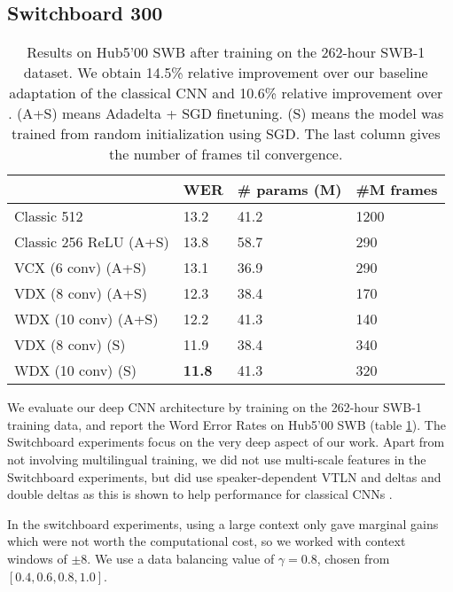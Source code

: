\documentclass{article}
\begin{document}
\subsection{Switchboard 300}
\label{ssec:swb}
\begin{table}[ht]
\centering
\begin{tabular}{| l | l | l | l |}
    \hline
    & WER &  \# params (M) & \#M frames\\ \hline
    Classic 512 \cite{soltau2014joint}      & 13.2  & 41.2 & 1200 \\
\hline
    Classic 256 ReLU (A+S)                        & 13.8  & 58.7 & 290 \\
    VCX (6 conv) (A+S)                            & 13.1  & 36.9 & 290 \\
    VDX (8 conv) (A+S)                            & 12.3  & 38.4 & 170 \\ WDX (10 conv) (A+S)                           & 12.2  & 41.3 & 140 \\ \hline
    VDX (8 conv) (S)                        & 11.9  & 38.4 & 340 \\  WDX (10 conv) (S)                       & \bf{11.8}  & 41.3 & 320 \\  \hline
\end{tabular}
\caption{\label{tab:hub5}Results on Hub5'00 SWB after training on the 262-hour SWB-1 dataset.
    We obtain 14.5\% relative improvement
    over our baseline adaptation of the classical CNN
    and 10.6\% relative improvement over \cite{soltau2014joint}.
    (A+S) means Adadelta + SGD finetuning. 
    (S) means the model was trained from random initialization using SGD.
    The last column gives the number of frames til convergence.
}
\end{table}

We evaluate our deep CNN architecture by training on the 262-hour SWB-1 training data,
and report the Word Error Rates on Hub5'00 SWB (table \ref{tab:hub5}).
The Switchboard experiments focus on the very deep aspect of our work.
Apart from not involving multilingual training,
we did not use multi-scale features in the Switchboard experiments, 
but did use speaker-dependent VTLN and deltas and double deltas as this is shown to help
performance for classical CNNs \cite{sainath2013deep}.

In the switchboard experiments, using a large context only gave marginal gains
which were not worth the computational cost,
so we worked with context windows of $\pm$8.
We use a data balancing value of $\gamma=0.8$, 
chosen from $[0.4,0.6,0.8,1.0]$.
\end{document}
